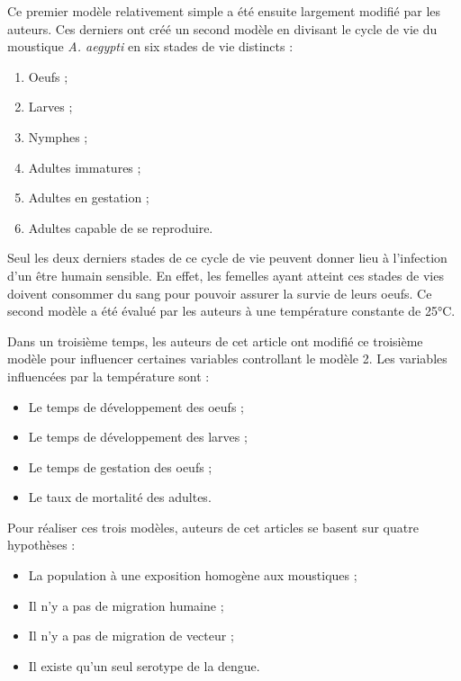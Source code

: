 \documentclass[
  12pt,
  french,
  oneside]{article}
\providecommand{\tightlist}{%
  \setlength{\itemsep}{0pt}\setlength{\parskip}{0pt}}
\begin{document}
Ce premier modèle relativement simple a été ensuite largement modifié
par les auteurs. Ces derniers ont créé un second modèle en divisant le
cycle de vie du moustique \emph{A. aegypti} en six stades de vie
distincts :

\begin{enumerate}
\def\labelenumi{\arabic{enumi}.}
\tightlist
\item
  Oeufs ;
\item
  Larves ;
\item
  Nymphes ;
\item
  Adultes immatures ;
\item
  Adultes en gestation ;
\item
  Adultes capable de se reproduire.
\end{enumerate}

Seul les deux derniers stades de ce cycle de vie peuvent donner lieu à
l'infection d'un être humain sensible. En effet, les femelles ayant
atteint ces stades de vies doivent consommer du sang pour pouvoir
assurer la survie de leurs oeufs. Ce second modèle a été évalué par les
auteurs à une température constante de 25°C.

Dans un troisième temps, les auteurs de cet article ont modifié ce
troisième modèle pour influencer certaines variables controllant le
modèle 2. Les variables influencées par la température sont :

\begin{itemize}
\tightlist
\item
  Le temps de développement des oeufs ;
\item
  Le temps de développement des larves ;
\item
  Le temps de gestation des oeufs ;
\item
  Le taux de mortalité des adultes.
\end{itemize}

Pour réaliser ces trois modèles, auteurs de cet articles se basent sur
quatre hypothèses :

\begin{itemize}
\tightlist
\item
  La population à une exposition homogène aux moustiques ;
\item
  Il n'y a pas de migration humaine ;
\item
  Il n'y a pas de migration de vecteur ;
\item
  Il existe qu'un seul serotype de la dengue.
\end{itemize}
\end{document}
